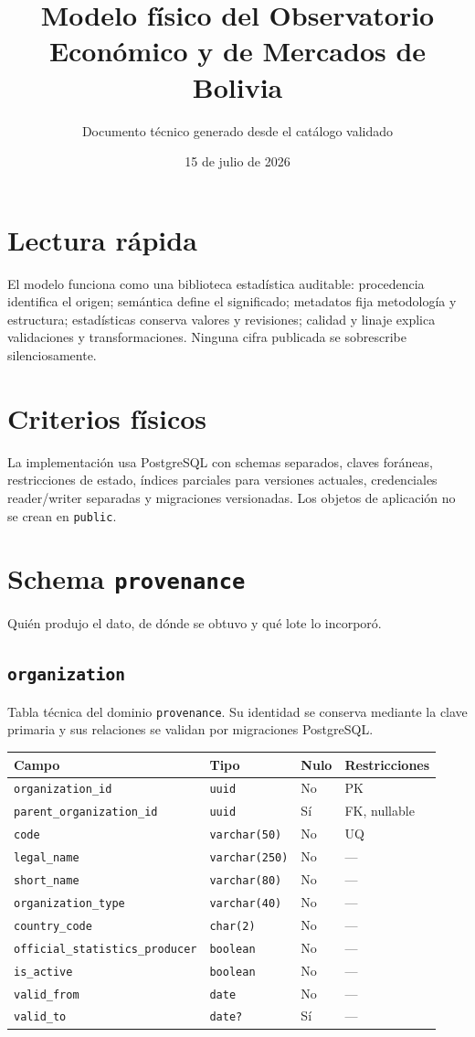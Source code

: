 \documentclass[11pt]{article}
\title{Modelo físico del Observatorio Económico y de Mercados de Bolivia}
\author{Documento técnico generado desde el catálogo validado}
\date{15 de julio de 2026}
\begin{document}
\maketitle
\tableofcontents
\newpage
\section{Lectura rápida}
El modelo funciona como una biblioteca estadística auditable: procedencia identifica el origen; semántica define el significado; metadatos fija metodología y estructura; estadísticas conserva valores y revisiones; calidad y linaje explica validaciones y transformaciones. Ninguna cifra publicada se sobrescribe silenciosamente.
\section{Criterios físicos}
La implementación usa PostgreSQL con schemas separados, claves foráneas, restricciones de estado, índices parciales para versiones actuales, credenciales reader/writer separadas y migraciones versionadas. Los objetos de aplicación no se crean en \texttt{public}.

\section{Schema \texttt{provenance}}
Quién produjo el dato, de dónde se obtuvo y qué lote lo incorporó.
\subsection{\texttt{organization}}
Tabla técnica del dominio \texttt{provenance}. Su identidad se conserva mediante la clave primaria y sus relaciones se validan por migraciones PostgreSQL.
\begin{longtable}{>{\raggedright\arraybackslash}p{} p{} p{} p{}}
\toprule Campo & Tipo & Nulo & Restricciones \\ \midrule\endhead
\texttt{organization\_id} & \texttt{uuid} & No & PK \\
\texttt{parent\_organization\_id} & \texttt{uuid} & Sí & FK, nullable \\
\texttt{code} & \texttt{varchar(50)} & No & UQ \\
\texttt{legal\_name} & \texttt{varchar(250)} & No & --- \\
\texttt{short\_name} & \texttt{varchar(80)} & No & --- \\
\texttt{organization\_type} & \texttt{varchar(40)} & No & --- \\
\texttt{country\_code} & \texttt{char(2)} & No & --- \\
\texttt{official\_statistics\_producer} & \texttt{boolean} & No & --- \\
\texttt{is\_active} & \texttt{boolean} & No & --- \\
\texttt{valid\_from} & \texttt{date} & No & --- \\
\texttt{valid\_to} & \texttt{date?} & Sí & --- \\
\bottomrule\end{longtable}
\end{document}
